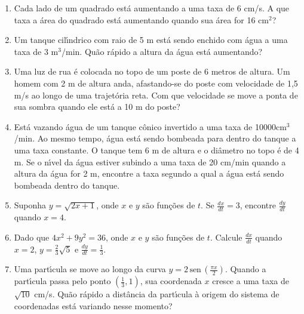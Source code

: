 \documentclass[a4paper,5pt]{amsbook}
\newcommand{\sen}{\,\mbox{sen}\,}
\newcommand{\ds}{\displaystyle}
\begin{document}
\begin{enumerate}
    \vspace{0.5cm}
    \item Cada lado de um quadrado est\'a aumentando a uma taxa de 6 cm/s. A
        que taxa a \'area do quadrado est\'a aumentando quando sua \'area for 16
        cm$^2$?

    \vspace{0.5cm}
    \item Um tanque cil\'{\i}ndrico com raio de 5 m est\'a sendo enchido com \'agua a
        uma taxa de 3 m$^3$/min. Qu\~ao r\'apido a altura da \'agua est\'a
        aumentando?

    \vspace{0.5cm}
    \item Uma luz de rua \'e colocada no topo de um poste de 6 metros de
        altura. Um homem com 2 m de altura anda, afastando-se do poste com
        velocidade de 1,5 m/s ao longo de uma trajet\'oria reta. Com que
        velocidade se move a ponta de sua sombra quando ele est\'a a 10 m do
        poste?

    \vspace{0.5cm}
    \item Est\'a vazando \'agua de um tanque c\^onico invertido a uma taxa de
        10000cm$^3$/min. Ao mesmo tempo, \'agua est\'a sendo bombeada para dentro do
        tanque a uma taxa constante. O tanque tem 6 m de altura e o di\^ametro
        no topo \'e de 4 m. Se o n\'{\i}vel da \'agua estiver subindo a uma taxa de 20
        cm/min quando a altura da \'agua for 2 m, encontre a taxa segundo a
        qual a \'agua est\'a sendo bombeada dentro do tanque.

    \vspace{0.5cm}
    \item Suponha $y=\sqrt{2x+1}$, onde $x$ e $y$ s\~ao fun\c{c}\~oes de $t$.  Se
        $\ds\frac{dx}{dt}=3$, encontre $\ds\frac{dy}{dt}$ quando $x=4$.

    \vspace{0.5cm}
    \item Dado que $4x^2+9y^2=36$, onde $x$ e $y$ s\~ao fun\c{c}\~oes de $t$. Calcule
        $\ds\frac{dx}{dt}$ quando $x=2$, $y=\ds\frac{2}{3}\sqrt{5}$ e
        $\ds\frac{dy}{dt}=\frac{1}{3}$.

    \vspace{0.5cm}
    \item Uma part\'{\i}cula se move ao longo da curva $y=2\ds\sen{\left(\frac{\pi
                    x}{2}\right)}$. Quando a part\'{\i}cula passa pelo ponto
        $\left(\ds\frac{1}{3},1\right)$, sua coordenada $x$ cresce a uma taxa
        de $\sqrt{10}$ cm/s. Qu\~ao r\'apido a dist\^ancia da part\'{\i}cula \`a origem do
        sistema de coordenadas est\'a variando nesse momento?


\end{enumerate}
\end{document}
